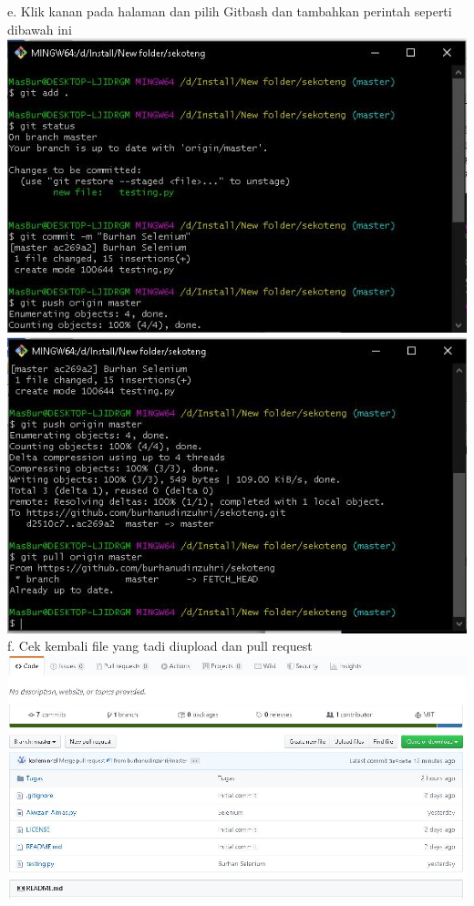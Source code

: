 \documentclass{article}
\newcounter{saveenumi}
\newcommand{\seti}{\setcounter{saveenumi}{\value{enumi}}} %
\begin{document}
\begin{enumerate}
                \newline
            	e. Klik kanan pada halaman dan pilih Gitbash dan tambahkan perintah seperti dibawah ini
                \newline
                \includegraphics[scale=0.4]{33.3e1.jpg}
                \newline
                \includegraphics[scale=0.4]{33.3e2.jpg}
                \newline
            	f. Cek kembali file yang tadi diupload dan pull request
                \newline
                \includegraphics[scale=0.4]{33.3f.jpg}
                \newline
            \seti %
        \end{enumerate}
    
\end{document}
